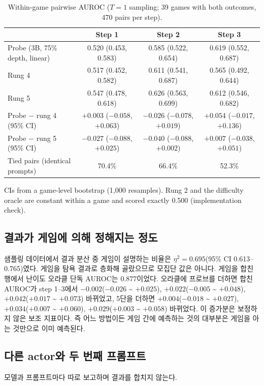 \documentclass[11pt]{article}
\begin{document}
\begin{table}[t]
\centering\small
\caption{Within-game pairwise AUROC ($T = 1$ sampling; 39 games with both outcomes, 470 pairs per step).}\label{tab:within}
\begin{tabularx}{\linewidth}{@{}Lccc@{}}
\toprule
 & Step 1 & Step 2 & Step 3 \\
\midrule
Probe (3B, 75\% depth, linear) & 0.520 (0.453, 0.583) & 0.585 (0.522, 0.654) & 0.619 (0.552, 0.687) \\
Rung 4 & 0.517 (0.452, 0.582) & 0.611 (0.541, 0.687) & 0.565 (0.492, 0.644) \\
Rung 5 & 0.547 (0.478, 0.618) & 0.626 (0.563, 0.699) & 0.612 (0.546, 0.682) \\
Probe $-$ rung 4 (95\% CI) & $+0.003$ ($-0.058$, $+0.063$) & $-0.026$ ($-0.078$, $+0.019$) & $+0.054$ ($-0.017$, $+0.136$) \\
Probe $-$ rung 5 (95\% CI) & $-0.027$ ($-0.088$, $+0.025$) & $-0.040$ ($-0.088$, $+0.002$) & $+0.007$ ($-0.038$, $+0.051$) \\
Tied pairs (identical prompts) & 70.4\% & 66.4\% & 52.3\% \\
\bottomrule
\end{tabularx}
\par\smallskip\raggedright\footnotesize
CIs from a game-level bootstrap (1,000 resamples). Rung 2 and the difficulty oracle are constant within a game and scored exactly 0.500 (implementation check).
\end{table}

\subsection{결과가 게임에 의해 정해지는 정도}
샘플링 데이터에서 결과 분산 중 게임이 설명하는 비율은 $\eta^2 = 0.695$(95\% CI 0.613--0.765)였다. 게임을 탐욕 결과로 층화해 골랐으므로 모집단 값은 아니다.
게임을 합친 행에서 난이도 오라클 단독 AUROC는 0.877이었다. 오라클에 프로브를 더하면 합친 AUROC가 step 1--3에서 $-0.002$($-0.026$ \textasciitilde{} $+0.025$), $+0.022$($-0.005$ \textasciitilde{} $+0.048$),
$+0.042$($+0.017$ \textasciitilde{} $+0.073$) 바뀌었고, 5단을 더하면 $+0.004$($-0.018$ \textasciitilde{} $+0.027$), $+0.034$($+0.007$ \textasciitilde{} $+0.060$), $+0.029$($+0.003$ \textasciitilde{} $+0.058$) 바뀌었다. 이 증가분은 보정하지 않은 보조 지표이다.
즉 어느 방법이든 게임 간에 예측하는 것의 대부분은 게임을 아는 것만으로 이미 예측된다.

\subsection{다른 actor와 두 번째 프롬프트}\label{sec:actors}
모델과 프롬프트마다 따로 보고하며 결과를 합치지 않는다.
\end{document}
